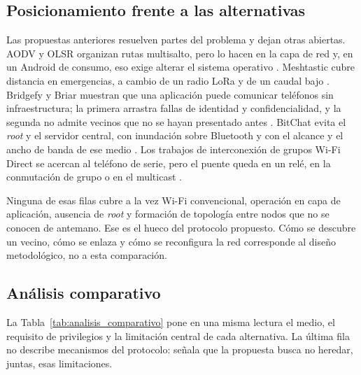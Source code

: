 \documentclass[12pt,oneside]{scrreprt}
\begin{document}
\subsection{Posicionamiento frente a las alternativas}

Las propuestas anteriores resuelven partes del problema y dejan otras abiertas. AODV y OLSR organizan rutas multisalto, pero lo hacen en la capa de red y, en un Android de consumo, eso exige alterar el sistema operativo \parencite{Perkins2003,Clausen2003}. Meshtastic cubre distancia en emergencias, a cambio de un radio LoRa y de un caudal bajo \parencite{MeshtasticProject2023}. Bridgefy y Briar muestran que una aplicación puede comunicar teléfonos sin infraestructura; la primera arrastra fallas de identidad y confidencialidad, y la segunda no admite vecinos que no se hayan presentado antes \parencite{Albrecht2021a,BriarProject2021}. BitChat evita el \emph{root} y el servidor central, con inundación sobre Bluetooth y con el alcance y el ancho de banda de ese medio \parencite{Biagioni2026}. Los trabajos de interconexión de grupos Wi-Fi Direct se acercan al teléfono de serie, pero el puente queda en un relé, en la conmutación de grupo o en el multicast \parencite{Funai2017,Casetti2015,Dao2024}.

Ninguna de esas filas cubre a la vez Wi-Fi convencional, operación en capa de aplicación, ausencia de \emph{root} y formación de topología entre nodos que no se conocen de antemano. Ese es el hueco del protocolo propuesto. Cómo se descubre un vecino, cómo se enlaza y cómo se reconfigura la red corresponde al diseño metodológico, no a esta comparación.

\subsection{Análisis comparativo}

La Tabla~\ref{tab:analisis_comparativo} pone en una misma lectura el medio, el requisito de privilegios y la limitación central de cada alternativa. La última fila no describe mecanismos del protocolo: señala que la propuesta busca no heredar, juntas, esas limitaciones.
\end{document}
